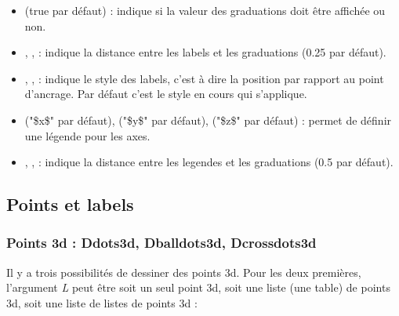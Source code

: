 \documentclass[%
10pt,%
a4paper,%
french,%
]%
{article}%
\begin{document}
\begin{itemize}
    \item {} (true par défaut) : indique si la valeur des graduations doit être affichée ou non.
    
    \item {}, ,  : indique la distance entre les labels et les graduations (0.25 par défaut).
    
    \item {}, ,  : indique le style des labels, c'est à dire la position par rapport au point d'ancrage. Par défaut c'est le style en cours qui s'applique.

    \item {} ("\$x\$" par défaut),  ("\$y\$" par défaut),  ("\$z\$" par défaut) : permet de définir une légende pour les axes.
    
    \item {}, ,  : indique la distance entre les legendes et les graduations (0.5 par défaut).     
\end{itemize}

\subsection{Points et labels}

\subsubsection{Points 3d : Ddots3d, Dballdots3d, Dcrossdots3d}

Il y a trois possibilités de dessiner des points 3d. Pour les deux premières, l'argument \emph{L} peut être soit un seul point 3d, soit une liste (une table) de points 3d, soit une liste de listes de points 3d :
\end{document}
